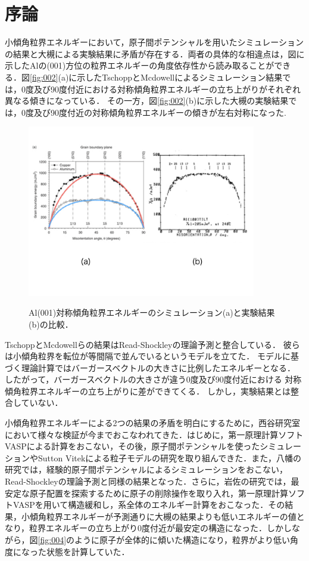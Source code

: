 
\section{序論}
小傾角粒界エネルギーにおいて，原子間ポテンシャルを用いたシミュレーションの結果と大槻による実験結果に矛盾が存在する．両者の具体的な相違点は，図に示したAlの(001)方位の粒界エネルギーの角度依存性から読み取ることができる．図\ref{fig:002}(a)に示したTschoppとMcdowellによるシミュレーション結果では，0度及び90度付近における対称傾角粒界エネルギーの立ち上がりがそれぞれ異なる傾きになっている\cite{TschoppMcdowell}．
その一方，図\ref{fig:002}(b)に示した大槻の実験結果では，0度及び90度付近の対称傾角粒界エネルギーの傾きが左右対称になった\cite{Otsuki}.

\begin{figure}[htbp]\begin{center}
\includegraphics[width=10cm,bb= 0 0 737 553]{../figs/./boundary_energy_calc_exp.jpeg}
\caption{Al(001)対称傾角粒界エネルギーのシミュレーション(a)と実験結果(b)の比較．}
\label{fig:002}
\label{default}\end{center}\end{figure}
TschoppとMcdowellらの結果はRead-Shockleyの理論予測と整合している．
彼らは小傾角粒界を転位が等間隔で並んでいるというモデルを立てた\cite{ReadShockley}．
モデルに基づく理論計算ではバーガースベクトルの大きさに比例したエネルギーとなる．
したがって，バーガースベクトルの大きさが違う0度及び90度付近における
対称傾角粒界エネルギーの立ち上がりに差ができてくる．
しかし，実験結果とは整合していない．

小傾角粒界エネルギーによる2つの結果の矛盾を明白にするために，西谷研究室において様々な検証が今までおこなわれてきた．はじめに，第一原理計算ソフトVASPによる計算をおこない，その後，原子間ポテンシャルを使ったシミュレーションやSutton Vitekによる粒子モデルの研究を取り組んできた\cite{Murakami}．また，八幡の研究では，経験的原子間ポテンシャルによるシミュレーションをおこない，Read-Shockleyの理論予測と同様の結果となった\cite{Yahata}．さらに，岩佐の研究では，最安定な原子配置を探索するために原子の削除操作を取り入れ，第一原理計算ソフトVASPを用いて構造緩和し，系全体のエネルギー計算をおこなった\cite{Iwasa}．その結果，小傾角粒界エネルギーが予測通りに大槻の結果よりも低いエネルギーの値となり，粒界エネルギーの立ち上がり0度付近が最安定の構造になった．しかしながら，図\ref{fig:004}のように原子が全体的に傾いた構造になり，粒界がより低い角度になった状態を計算していた．

